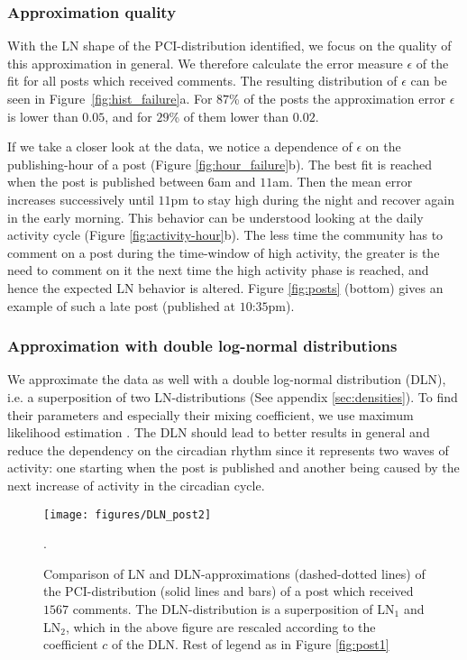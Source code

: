 \documentclass[twoside,11pt]{article}
\begin{document}
\subsubsection{Approximation quality}\noindent
With the LN shape of the PCI-distribution identified, we focus on the
quality of this approximation in general.  We therefore calculate the
error measure $\epsilon$ of the fit for all posts which received
comments.  The resulting distribution of $\epsilon$ can be seen in
Figure~\ref{fig:hist_failure}a.  For $87$\% of the posts the
approximation error $\epsilon$ is lower than $0.05$, and for $29$\% of
them lower than $0.02$.

If we take a closer look at the data, we notice a dependence of
$\epsilon$ on the publishing-hour of a post (Figure
\ref{fig:hour_failure}b).  The best fit is reached when the post is
published between $6$am and $11$am. Then the mean error increases
successively until $11$pm to stay high during the night and recover
again in the early morning. This behavior can be understood looking at
the daily activity cycle (Figure \ref{fig:activity-hour}b).  The less
time the community has to comment on a post during the time-window of
high activity, the greater is the need to comment on it the next time
the high activity phase is reached, and hence the expected LN behavior
is altered. Figure \ref{fig:posts} (bottom) gives an example of such a
late post (published at $10$:$35$pm).

\subsubsection{Approximation with  double log-normal distributions}
\noindent 
We approximate the data as well with a double log-normal distribution
(DLN), i.e. a superposition of two LN-distributions (See appendix
\ref{sec:densities}).  To find their parameters and especially their
mixing coefficient, we use maximum likelihood estimation
\citep{Stouffer06, DeGroot2002}.  The DLN should lead to better results
in general and reduce the dependency on the circadian rhythm since it
represents two waves of activity: one starting when the post is
published and another being caused by the next increase of activity in
the circadian cycle.

\begin{figure}[!t]\centering
\texttt{[image: figures/DLN\_post2]}
\caption{Comparison of LN and DLN-approximations (dashed-dotted lines)
  of the PCI-distribution (solid lines and bars) of a post which
  received $1567$ comments.  The DLN-distribution is a superposition
  of LN$_1$ and LN$_2$, which in the above figure are rescaled
  according to the coefficient $c$ of the DLN. Rest of legend as in
  Figure \ref{fig:post1}}.
\label{fig:post_DLN}
\end{figure}
\end{document}
